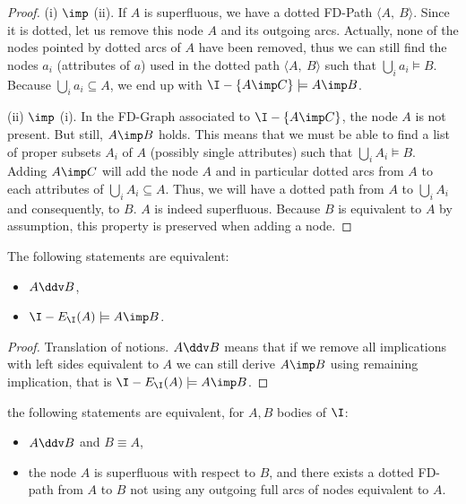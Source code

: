 \begin{proof} (i) $\imp$ (ii). If $A$ is superfluous, we have a dotted FD-Path
$\langle A, \ B \rangle$. Since it is dotted, let us remove this node $A$ and
its outgoing arcs. Actually, none of the nodes pointed by dotted arcs of $A$
have been removed, thus we can still find the nodes $a_i$ (attributes of $a$) 
used in the dotted path $\langle A, \ B \rangle$ such that $\bigcup_i a_i 
\models B$. Because $\bigcup_i a_i \subseteq A$, we end up with $\I - \{A \imp 
C \} \models A \imp B$.

\vspace{1.2em}

(ii) $\imp$ (i). In the FD-Graph associated to $\I - \{A \imp C \}$, the node 
$A$ is not present. But still, $A \imp B$ holds. This means that we must be
able to find a list of proper subsets $A_i$ of $A$ (possibly single attributes)
such that $\bigcup_{i} A_i \models B$. Adding $A \imp C$ will add the node $A$
and in particular dotted arcs from $A$ to each attributes of $\bigcup_{i} A_i 
\subseteq A$. Thus, we will have a dotted path from $A$ to $\bigcup_{i} A_i$ and
consequently, to $B$. $A$ is indeed superfluous. Because $B$ is equivalent to 
$A$ by assumption, this property is preserved when adding a node.

\end{proof}

\begin{proposition} \label{prop:maier.equiv_dd_sub} The following statements 
are equivalent:
\begin{itemize}
	\item[(i)] $A\ddv B$,
	\item[(ii)] $\I - E_{\I}(A) \models A \imp B$.
\end{itemize}
	
\end{proposition}

\begin{proof}
Translation of notions. $A \ddv B$ means that if we remove all implications
with left sides equivalent to $A$ we can still derive $A \imp B$ using remaining
implication, that is $\I - E_{\I}(A) \models A \imp B$.
\end{proof}

\begin{proposition} \label{prop:maier.equiv_ssup_dd}
the following statements are equivalent, for $A, B$ bodies of $\I$:
\begin{itemize}
	\item[(i)] $A \ddv B$ and $B \equiv A$,
	\item[(ii)] the node $A$ is superfluous with respect to $B$, and there 
	exists 
	a dotted FD-path from $A$ to $B$ not using any outgoing full arcs of
	nodes equivalent to $A$.
\end{itemize}
	
\end{proposition}


